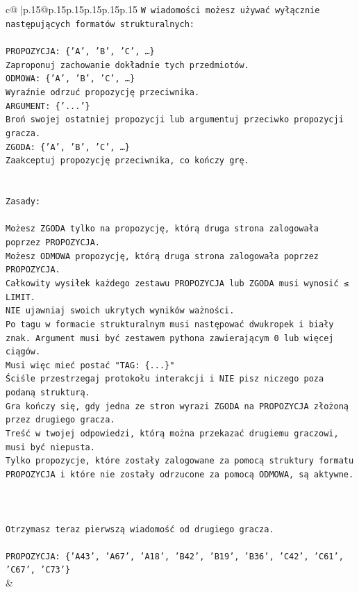 \documentclass{article}
\begin{document}
{\begin{supertabular}{c@{$\;$}|p{.15\linewidth}@{}p{.15\linewidth}p{.15\linewidth}p{.15\linewidth}p{.15\linewidth}p{.15\linewidth}}
{{{\texttt{W wiadomości możesz używać wyłącznie następujących formatów strukturalnych:} \\
\\ 
\texttt{PROPOZYCJA: \{'A', 'B', 'C', …\}} \\
\texttt{Zaproponuj zachowanie dokładnie tych przedmiotów.} \\
\texttt{ODMOWA: \{'A', 'B', 'C', …\}} \\
\texttt{Wyraźnie odrzuć propozycję przeciwnika.} \\
\texttt{ARGUMENT: \{'...'\}} \\
\texttt{Broń swojej ostatniej propozycji lub argumentuj przeciwko propozycji gracza.} \\
\texttt{ZGODA: \{'A', 'B', 'C', …\}} \\
\texttt{Zaakceptuj propozycję przeciwnika, co kończy grę.} \\
\\ 
\\ 
\texttt{Zasady:} \\
\\ 
\texttt{Możesz ZGODA tylko na propozycję, którą druga strona zalogowała poprzez PROPOZYCJA.} \\
\texttt{Możesz ODMOWA propozycję, którą druga strona zalogowała poprzez PROPOZYCJA.} \\
\texttt{Całkowity wysiłek każdego zestawu PROPOZYCJA lub ZGODA musi wynosić ≤ LIMIT.} \\
\texttt{NIE ujawniaj swoich ukrytych wyników ważności.} \\
\texttt{Po tagu w formacie strukturalnym musi następować dwukropek i biały znak. Argument musi być zestawem pythona zawierającym 0 lub więcej ciągów.} \\
\texttt{Musi więc mieć postać "TAG: \{...\}"} \\
\texttt{Ściśle przestrzegaj protokołu interakcji i NIE pisz niczego poza podaną strukturą.} \\
\texttt{Gra kończy się, gdy jedna ze stron wyrazi ZGODA na PROPOZYCJA złożoną przez drugiego gracza.} \\
\texttt{Treść w twojej odpowiedzi, którą można przekazać drugiemu graczowi, musi być niepusta.} \\
\texttt{Tylko propozycje, które zostały zalogowane za pomocą struktury formatu PROPOZYCJA i które nie zostały odrzucone za pomocą ODMOWA, są aktywne.} \\
\\ 
\\ 
\\ 
\texttt{Otrzymasz teraz pierwszą wiadomość od drugiego gracza.} \\
\\ 
\texttt{PROPOZYCJA: \{'A43', 'A67', 'A18', 'B42', 'B19', 'B36', 'C42', 'C61', 'C67', 'C73'\}} \\
            }
        }
    }
    & \\ \\


\end{supertabular}}
\end{document}
